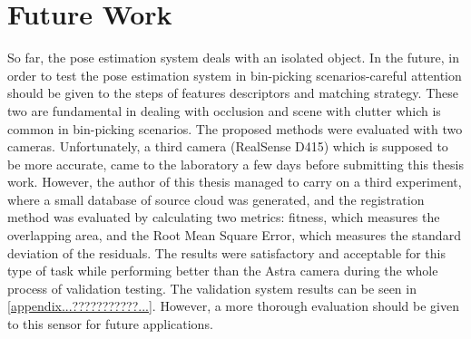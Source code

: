 \chapter{Future Work}
\label{chap:futurework}


So far, the pose estimation system deals with an isolated object. In the future, in order to test the pose estimation system in bin-picking scenarios-careful attention should be given to the steps of features descriptors and matching strategy. These two are fundamental in dealing with occlusion and scene with clutter which is common in bin-picking scenarios. The proposed methods were evaluated with two cameras. Unfortunately, a third camera (RealSense D415) which is supposed to be more accurate, came to the laboratory a few days before submitting this thesis work. However, the author of this thesis managed to carry on a third experiment, where a small database of source cloud was generated, and the registration method was evaluated by calculating two metrics: fitness, which measures the overlapping area, and the Root Mean Square Error, which measures the standard deviation of the residuals.
 The results were satisfactory and acceptable for this type of task while performing better than the Astra camera during the whole process of validation testing. The validation system results can be seen in  \ref{appendix...???????????...}. However, a more thorough evaluation should be given to this sensor for future applications.  
